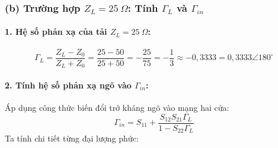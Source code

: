 \documentclass[12pt,a4paper]{article}
\begin{document}
\subsubsection{(b) Trường hợp $Z_L = 25~\Omega$: Tính $\Gamma_L$ và $\Gamma_{in}$}
\paragraph{1. Hệ số phản xạ của tải $Z_L = 25~\Omega$:}
\[
\boxed{\Gamma_L = \frac{Z_L - Z_0}{Z_L + Z_0} = \frac{25 - 50}{25 + 50} = -\frac{25}{75} = -\frac{1}{3} \approx -0{,}3333 = 0{,}3333\angle 180^\circ}
\]

\paragraph{2. Tính hệ số phản xạ ngõ vào $\Gamma_{in}$:}
Áp dụng công thức biến đổi trở kháng ngõ vào mạng hai cửa:
\[
\Gamma_{in} = S_{11} + \frac{S_{12}S_{21}\Gamma_L}{1 - S_{22}\Gamma_L}
\]
Ta tính chi tiết từng đại lượng phức:
\end{document}
